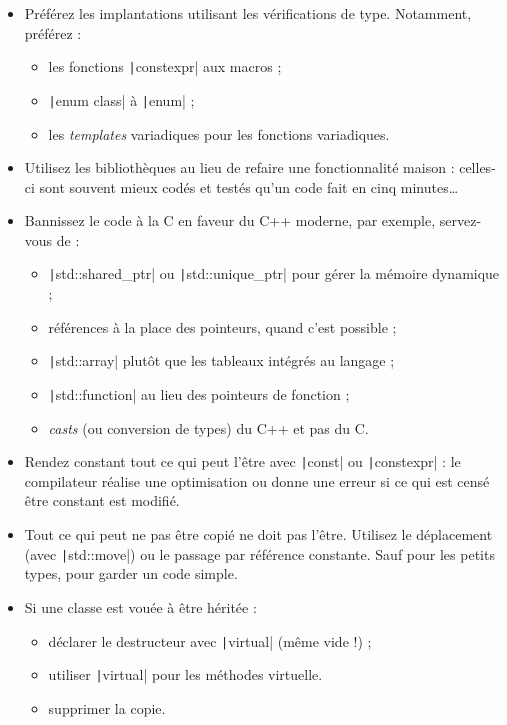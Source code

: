\documentclass[12pt,a4paper]{article}
\newcommand{\flenglish}[1]{\emph{\foreignlanguage{english}{#1}}}
\begin{document}
\begin{itemize}
\item Préférez les implantations utilisant les vérifications de type. Notamment, préférez :
	\begin{itemize}
	\item les fonctions \texttt|constexpr| aux macros ;
	\item \texttt|enum class| à \texttt|enum| ;
	\item les \flenglish{templates} variadiques pour les fonctions variadiques.
	\end{itemize}
\item Utilisez les bibliothèques au lieu de refaire une fonctionnalité \og maison \fg{} : celles-ci sont souvent mieux codés et testés qu'un code fait en cinq minutes\dots{}
\item Bannissez le code \og à la C \fg{} en faveur du C++ moderne, par exemple, servez-vous de :
	\begin{itemize}
	\item \texttt|std::shared_ptr| ou \texttt|std::unique_ptr| pour gérer la mémoire dynamique ;
	\item références à la place des pointeurs, quand c'est possible ;
	\item \texttt|std::array| plutôt que les tableaux intégrés au langage ;
	\item \texttt|std::function| au lieu des pointeurs de fonction ;
	\item \flenglish{casts} (ou conversion de types) du C++ et pas du C.
	\end{itemize}
\item Rendez constant tout ce qui peut l'être avec \texttt|const| ou \texttt|constexpr| : le compilateur réalise une optimisation ou donne une erreur si ce qui est censé être constant est modifié.
\item Tout ce qui peut ne pas être copié ne doit pas l'être. Utilisez le déplacement (avec \texttt|std::move|) ou le passage par référence constante. Sauf pour les \og petits \fg{} types, pour garder un code simple.
\item Si une classe est vouée à être héritée :
	\begin{itemize}
	\item déclarer le destructeur avec \texttt|virtual| (même vide !) ;
	\item utiliser \texttt|virtual| pour les méthodes virtuelle.
	\item supprimer la copie.

\end{itemize}
\end{itemize}
\end{document}
